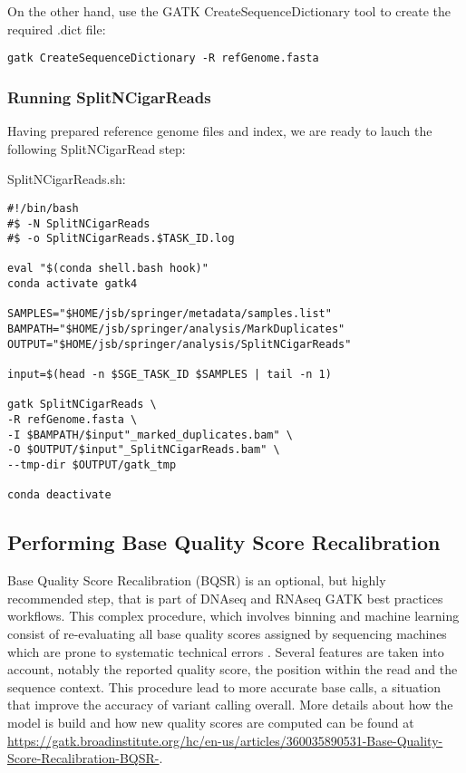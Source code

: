 On the other hand, use the GATK CreateSequenceDictionary tool to create the required .dict file:

\begin{verbatim}
gatk CreateSequenceDictionary -R refGenome.fasta
\end{verbatim}




\subsubsection{Running SplitNCigarReads}

Having prepared reference genome files and index, we are ready to lauch the following SplitNCigarRead step:

\noindent SplitNCigarReads.sh:
\begin{verbatim}
#!/bin/bash
#$ -N SplitNCigarReads
#$ -o SplitNCigarReads.$TASK_ID.log
	
eval "$(conda shell.bash hook)"
conda activate gatk4
	
SAMPLES="$HOME/jsb/springer/metadata/samples.list"
BAMPATH="$HOME/jsb/springer/analysis/MarkDuplicates"
OUTPUT="$HOME/jsb/springer/analysis/SplitNCigarReads"
	
input=$(head -n $SGE_TASK_ID $SAMPLES | tail -n 1)

gatk SplitNCigarReads \
-R refGenome.fasta \
-I $BAMPATH/$input"_marked_duplicates.bam" \
-O $OUTPUT/$input"_SplitNCigarReads.bam" \
--tmp-dir $OUTPUT/gatk_tmp
	
conda deactivate
\end{verbatim}



\subsection{Performing Base Quality Score Recalibration}

Base Quality Score Recalibration (BQSR) is an optional, but highly recommended step, that is part of DNAseq and RNAseq GATK best practices workflows. This complex procedure, which involves binning and machine learning consist of re-evaluating all base quality scores assigned by sequencing machines which are prone to systematic technical errors \cite{GATK_BaseQuality}. Several features are taken into account, notably the reported quality score, the position within the read and the sequence context. This procedure lead to more accurate base calls, a situation that improve the accuracy of variant calling overall. More details about how the model is build and how new quality scores are computed can be found at \href{https://gatk.broadinstitute.org/hc/en-us/articles/360035890531-Base-Quality-Score-Recalibration-BQSR-}{https://gatk.broadinstitute.org/hc/en-us/articles/360035890531-Base-Quality-Score-Recalibration-BQSR-}.

